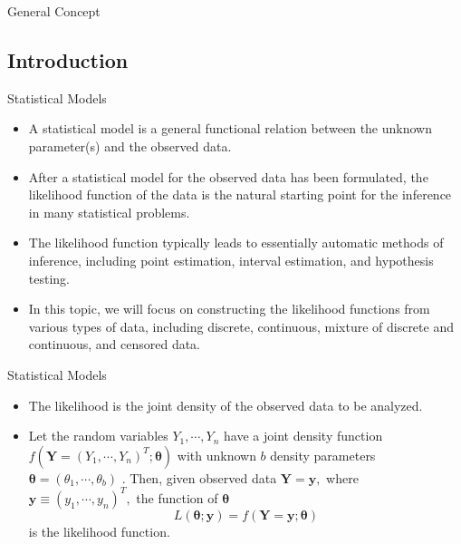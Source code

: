 \documentclass{beamer}
\begin{document}
\begin{section}{General Concept}                   %
    \subsection{Introduction}              %
    \begin{frame}{Statistical Models}
        \begin{itemize}
            \item A statistical model is a general functional relation between the unknown parameter(s) and
the observed data.
            \item After a statistical model for the observed data has been formulated, the likelihood function of the data is the natural starting point for the inference in many statistical problems.
            \item The likelihood function typically leads to essentially automatic methods of inference, including point estimation, interval estimation, and hypothesis testing.
            \item In this topic, we will focus on constructing the likelihood functions from various types of data, including discrete, continuous, mixture of discrete and continuous, and censored data.
        \end{itemize}
    \end{frame}

    \begin{frame}{Statistical Models}
        \begin{itemize}
            \item The likelihood is the joint density of the observed data to be analyzed.
            \item Let the random variables $Y_{1}, \cdots, Y_{n}$ have a joint density function  $f(\mathbf{Y} = (Y_{1}, \cdots, Y_{n})^{T}; \boldsymbol{\theta})$ with unknown  $b$ density parameters $\boldsymbol{\theta} = (\theta_{1}, \cdots, \theta_{b})$ . Then, given observed data $\mathbf{Y} = \mathbf{y},$ where $\mathbf{y} \equiv (y_{1}, \cdots, y_{n})^{T},$ the function of $\boldsymbol{\theta}$ 
$$L(\boldsymbol{\theta}; \mathbf{y}) = f(\mathbf{Y} = \mathbf{y};\boldsymbol{\theta})$$
is the likelihood function.
        \end{itemize}
    \end{frame}



\end{section}
\end{document}
